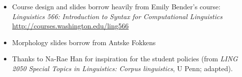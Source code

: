\documentclass[a4paper,landscape,headrule,footrule]{foils}
\begin{document}

\begin{itemize}
\item Course design and slides borrow heavily from Emily Bender's course:
\textit{Linguistics 566: Introduction to Syntax for Computational Linguistics}
\\ \url{http://courses.washington.edu/ling566}
\item Morphology slides borrow from Antske Fokkens 
\item Thanks to Na-Rae Han for 
  inspiration for the student policies (from  \textit{LING 2050 Special Topics in Linguistics: Corpus linguistics}, U Penn; adapted).

\end{itemize}
\end{document}
